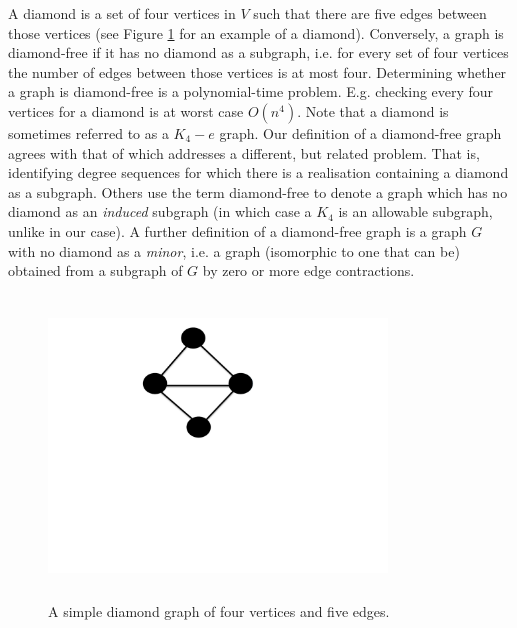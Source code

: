 \documentclass{l4proj}
\begin{document}
A diamond is a set of four vertices in $V$ such that there
are  five edges between those vertices (see Figure \ref{fig:g1} for an example of a diamond). Conversely, 
a graph is diamond-free if it has no diamond as a subgraph, i.e. for every set of four vertices 
the number of edges between those vertices is at most four. Determining whether a graph is diamond-free is a polynomial-time
problem. E.g. checking every four vertices for a diamond is at worst case $O(n^{4})$.  
Note that a diamond is sometimes referred to as a $K_{4}-e$ graph.  
Our definition of a diamond-free graph agrees with that of \cite{lai} which addresses a different, but related problem. 
That is, identifying degree sequences for which there is a realisation containing a diamond as a subgraph. 
Others use the term diamond-free to denote a graph which has no diamond as an {\it induced} subgraph 
(in which case a $K_{4}$ is an allowable subgraph, unlike in our case).
A further definition of a diamond-free graph \cite{bast} is a graph $G$ with no diamond as a {\it minor}, i.e. a graph 
(isomorphic to one that can be) obtained from a subgraph of $G$ by zero or more edge contractions.

\begin{figure}
\centering
\includegraphics[height=8.0cm,width=9.0cm]{g1}
\vspace{-2cm}
\caption{A simple diamond graph of four vertices and five edges.}
\label{fig:g1}
\end{figure}
\end{document}
